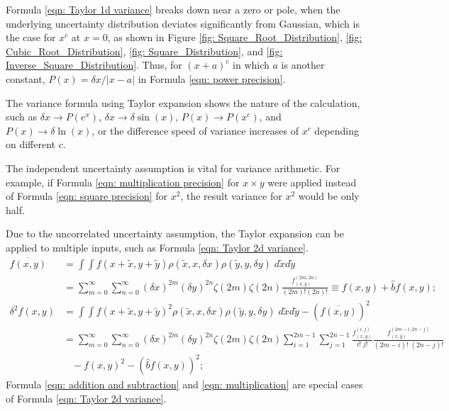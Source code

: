 \documentclass[twoside]{article}
\numberwithin{equation}{section}
\newcommand{\eqspace}{\;\;\;}
\begin{document}
Formula \eqref{eqn: Taylor 1d variance} breaks down near a zero or pole, when the underlying uncertainty distribution deviates significantly from Gaussian, which is the case for $x^c$ at $x=0$, as shown in Figure \ref{fig: Square_Root_Distribution}, \ref{fig: Cubic_Root_Distribution}, \ref{fig: Square_Distribution}, and \ref{fig: Inverse_Square_Distribution}.
Thus, for $(x+a)^c$ in which $a$ is another constant, $P(x) = \delta x / |x - a|$ in Formula \eqref{eqn: power precision}.

The variance formula using Taylor expansion shows the nature of the calculation, such as $\delta x \rightarrow P(e^x)$, $\delta x \rightarrow \delta \sin(x)$, $P(x) \rightarrow P(x^c)$, and $P(x) \rightarrow \delta \ln(x)$, or the difference speed of variance increases of $x^c$ depending on different $c$.

The independent uncertainty assumption is vital for variance arithmetic.
For example, if Formula \eqref{eqn: multiplication precision} for $x \times y$ were applied instead of Formula \eqref{eqn: square precision} for $x^2$, the result variance for $x^2$ would be only half.

Due to the uncorrelated uncertainty assumption, the Taylor expansion can be applied to multiple inputs, such as Formula \eqref{eqn: Taylor 2d variance}.
\begin{align}
\label{eqn: Taylor 2d mean}
\overline{f(x,y)} &= \int \int f(x + \tilde{x}, y + \tilde{y}) \rho(\tilde{x}, x, \delta x) \rho(\tilde{y}, y, \delta y)\; d \tilde{x} d \tilde{y} \nonumber \\
&= \sum_{m=0}^{\infty} \sum_{n=0}^{\infty} (\delta x)^{2m} (\delta y)^{2n} \zeta(2m) \zeta(2n)  \frac{f^{(2m,2n)}_{(x,y)}}{(2m)! (2n)!}
\equiv f(x,y) + \hat{b} f(x,y); \\
\label{eqn: Taylor 2d variance}
\delta^2 f(x, y) &= \int \int f(x + \tilde{x}, y + \tilde{y})^2 
    \rho(\tilde{x}, x, \delta x) \rho(\tilde{y}, y, \delta y)\; d \tilde{x} d \tilde{y} - \left( \overline{f(x, y)} \right)^2 \nonumber \\
&= \sum_{m=0}^{\infty} \sum_{n=0}^{\infty} (\delta x)^{2m} (\delta y)^{2n} \zeta(2m) \zeta(2n) 
  \sum_{i=1}^{2m-1} \sum_{j=1}^{2n-1} \frac{f^{(i,j)}_{(x,y)}}{i!\;j!}\frac{f^{(2m-i,2n-j)}_{(x,y)}}{(2m-i)!\;(2n-j)!} \nonumber \\
 &\eqspace - f(x,y)^2 - \left( \hat{b} f(x,y) \right)^2; 
\end{align}
Formula \eqref{eqn: addition and subtraction} and \eqref{eqn: multiplication} are special cases of Formula \eqref{eqn: Taylor 2d variance}.
\end{document}
